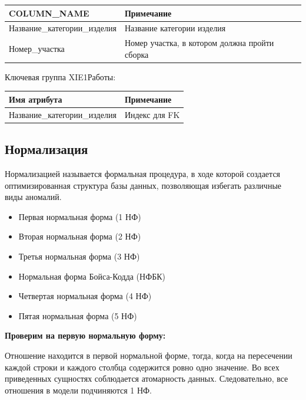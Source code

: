 \begin{enumerate}
    \begin{tabular}{|p{4cm}|p{5cm}|} \hline

        {\bf COLUMN\_NAME} & {\bf Примечание} \\ \hline
        Название\_категории\_изделия & Название категории изделия\\ \hline
        Номер\_участка & Номер участка, в котором должна пройти сборка \\ \hline

    \end{tabular}

    Ключевая группа XIE1Работы:

    \begin{tabular}{|p{4cm}|p{5cm}|} \hline

        {\bf Имя атрибута} & {\bf Примечание} \\ \hline
        Название\_категории\_изделия & Индекс для FK \\ \hline

    \end{tabular}

\end{enumerate}

\subsection {Нормализация}
Нормализацией называется формальная процедура, в ходе которой создается оптимизированная структура базы данных, позволяющая избегать различные виды аномалий.

\begin{itemize}
    \item Первая нормальная форма (1 НФ)
    \item Вторая нормальная форма (2 НФ)
    \item Третья нормальная форма (3 НФ)
    \item Нормальная форма Бойса-Кодда (НФБК)
    \item Четвертая нормальная форма (4 НФ)
    \item Пятая нормальная форма (5 НФ)
\end{itemize}

{\bf Проверим на первую нормальную форму:}

Отношение находится в первой нормальной форме, тогда, когда на пересечении каждой строки и каждого столбца содержится ровно одно значение.
Во всех приведенных сущностях соблюдается атомарность данных.
Следовательно, все отношения в модели подчиняются 1 НФ.

